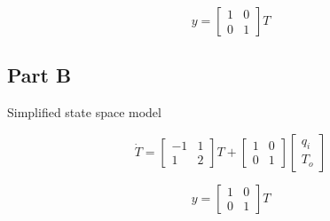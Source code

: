 \documentclass[12pt]{article}
\numberwithin{equation}{subsection}
\begin{document}
  \begin{equation}
    y =
    \begin{bmatrix}
      1 & 0 \\
      0 & 1
    \end{bmatrix}T
  \end{equation}

  \subsection{Part B}

  Simplified state space model

  \begin{equation}
    \dot T =
    \begin{bmatrix}
      -1 & 1 \\
      1 & 2
    \end{bmatrix} T +
    \begin{bmatrix}
      1 & 0\\0 & 1
    \end{bmatrix}
    \begin{bmatrix}
      q_i \\ T_o
    \end{bmatrix}
  \end{equation}

  \begin{equation}
    y = 
    \begin{bmatrix}
      1 & 0 \\
      0 & 1
    \end{bmatrix}T
  \end{equation}
\end{document}
